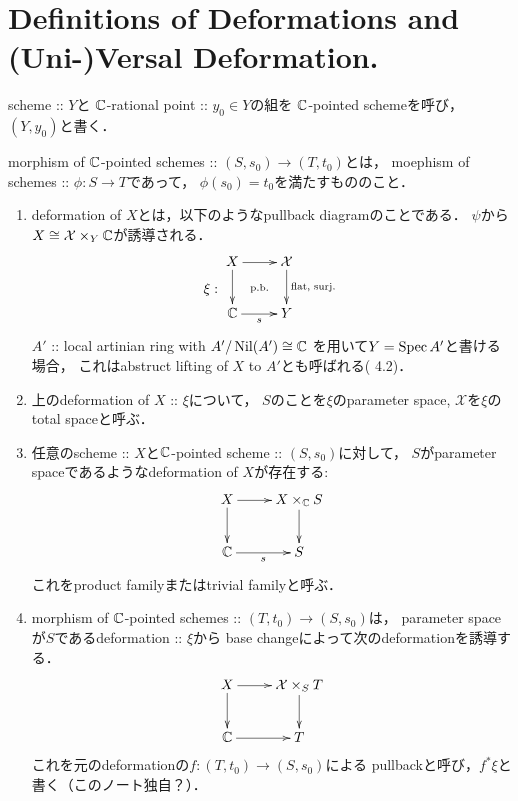 \documentclass[a4paper]{jsarticle}
\makeatletter
\newcommand{\famX}{\mathcal{X}}
\newcommand{\centerpb}{\ar@{}[lu]|{\text{p.b.}}}
\makeatother
\begin{document}
    \section{Definitions of Deformations and (Uni-)Versal Deformation.}
\begin{Def}
    scheme :: $Y$と
    $\mathbb{C}$-rational point :: $y_0 \in Y$の組を
    $\mathbb{C}$-pointed schemeを呼び，$(Y, y_0)$と書く．

    morphism of $\mathbb{C}$-pointed schemes :: $(S, s_0) \to (T, t_0)$とは，
    moephism of schemes :: $\phi: S \to T$であって，
    $\phi(s_0)=t_0$を満たすもののこと．
\end{Def}

\begin{Def}
    \begin{enumerate}[label=(\roman*), leftmargin=*]
    \item 
        deformation of $X$とは，以下のようなpullback diagramのことである．
        $\psi$から$X \iso \famX \times_{Y} \C$が誘導される．
        \[
            \xi:
        \vcenter{\xymatrix{
            X \ar[r] \ar[d]& \famX \ar[d]^-{\text{flat, surj.}} \\
            \C \ar[r]_-{s}& Y
            \centerpb
        }}
        \]
        $A'$ :: local artinian ring with $A'/\operatorname{Nil}(A') \cong \mathbb{C}$
        を用いて$Y=\operatorname{Spec} A'$と書ける場合，
        これはabstruct lifting of $X$ to $A'$とも呼ばれる(\cite{DefLCI} 4.2)．

    \item
        上のdeformation of $X$ :: $\xi$について，
        $S$のことを$\xi$のparameter space,
        $\famX$を$\xi$のtotal spaceと呼ぶ．

    \item
        任意のscheme :: $X$と$\mathbb{C}$-pointed scheme :: $(S, s_0)$に対して，
        $S$がparameter spaceであるようなdeformation of $X$が存在する:
        \[\xymatrix{
                X \ar[r]\ar[d]& X \times_{\C} S \ar[d]\\
                \C \ar[r]_-{s}& S
        }\]
        これをproduct familyまたはtrivial familyと呼ぶ．

    \item
        morphism of $\mathbb{C}$-pointed schemes :: $(T, t_0) \to (S, s_0)$は，
        parameter spaceが$S$であるdeformation :: $\xi$から
        base changeによって次のdeformationを誘導する．
        \[\xymatrix{
            X \ar[r]\ar[d]& \famX \times_S T \ar[d]\\
            \C \ar[r]& T
        }\]
        これを元のdeformationの$f: (T, t_0) \to (S, s_0)$による
        pullbackと呼び，$f^* \xi$と書く（このノート独自？）．


\end{enumerate}
\end{Def}
\end{document}
